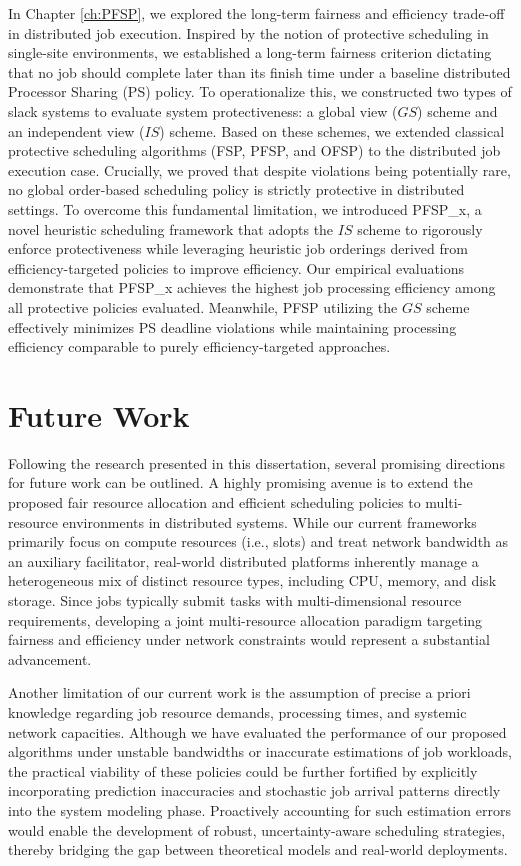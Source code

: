 In Chapter \ref{ch:PFSP}, we explored the long-term fairness and efficiency trade-off in distributed job execution. Inspired by the notion of protective scheduling in single-site environments, we established a long-term fairness criterion dictating that no job should complete later than its finish time under a baseline distributed Processor Sharing (PS) policy. To operationalize this, we constructed two types of slack systems to evaluate system protectiveness: a global view ($GS$) scheme and an independent view ($IS$) scheme. Based on these schemes, we extended classical protective scheduling algorithms (FSP, PFSP, and OFSP) to the distributed job execution case. Crucially, we proved that despite violations being potentially rare, no global order-based scheduling policy is strictly protective in distributed settings. To overcome this fundamental limitation, we introduced PFSP\_x, a novel heuristic scheduling framework that adopts the $IS$ scheme to rigorously enforce protectiveness while leveraging heuristic job orderings derived from efficiency-targeted policies to improve efficiency. Our empirical evaluations demonstrate that PFSP\_x achieves the highest job processing efficiency among all protective policies evaluated. Meanwhile, PFSP utilizing the $GS$ scheme effectively minimizes PS deadline violations while maintaining processing efficiency comparable to purely efficiency-targeted approaches.

\section{Future Work}
Following the research presented in this dissertation, several promising directions for future work can be outlined. A highly promising avenue is to extend the proposed fair resource allocation and efficient scheduling policies to multi-resource environments in distributed systems. While our current frameworks primarily focus on compute resources (i.e., slots) and treat network bandwidth as an auxiliary facilitator, real-world distributed platforms inherently manage a heterogeneous mix of distinct resource types, including CPU, memory, and disk storage. Since jobs typically submit tasks with multi-dimensional resource requirements, developing a joint multi-resource allocation paradigm targeting fairness and efficiency under network constraints would represent a substantial advancement. 

Another limitation of our current work is the assumption of precise a priori knowledge regarding job resource demands, processing times, and systemic network capacities. Although we have evaluated the performance of our proposed algorithms under unstable bandwidths or inaccurate estimations of job workloads, the practical viability of these policies could be further fortified by explicitly incorporating prediction inaccuracies and stochastic job arrival patterns directly into the system modeling phase. Proactively accounting for such estimation errors would enable the development of robust, uncertainty-aware scheduling strategies, thereby bridging the gap between theoretical models and real-world deployments. 

